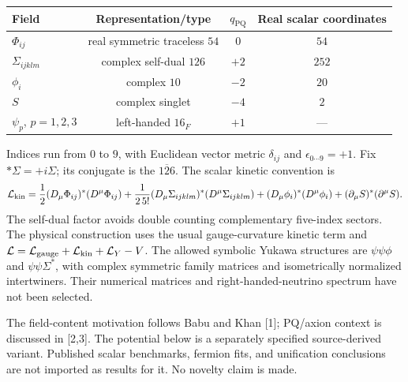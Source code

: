 \documentclass[10pt,letterpaper]{article}
\newcommand{\PQ}{\mathrm{PQ}}
\begin{document}
\begin{center}
\begin{tabular}{lccc}
\toprule Field & Representation/type & $q_{\PQ}$ & Real scalar coordinates\\
\midrule
$\Phi_{ij}$ & real symmetric traceless $54$ & $0$ & $54$\\
$\Sigma_{ijklm}$ & complex self-dual $126$ & $+2$ & $252$\\
$\phi_i$ & complex $10$ & $-2$ & $20$\\
$S$ & complex singlet & $-4$ & $2$\\
$\psi_p$, $p=1,2,3$ & left-handed $16_F$ & $+1$ & ---\\
\bottomrule
\end{tabular}
\end{center}
Indices run from $0$ to $9$, with Euclidean vector metric $\delta_{ij}$ and
$\epsilon_{0\cdots9}=+1$. Fix $*\Sigma=+i\Sigma$; its conjugate is the
$\overline{126}$. The scalar kinetic convention is
\[
\mathcal L_{\rm kin}=
\frac12(D_\mu\Phi_{ij})^*(D^\mu\Phi_{ij})
+\frac{1}{2\,5!}(D_\mu\Sigma_{ijklm})^*(D^\mu\Sigma_{ijklm})
+(D_\mu\phi_i)^*(D^\mu\phi_i)+(\partial_\mu S)^*(\partial^\mu S).
\]
The self-dual factor avoids double counting complementary five-index sectors.
The physical construction uses the usual gauge-curvature kinetic term and
$\mathcal L=\mathcal L_{\rm gauge}+\mathcal L_{\rm kin}+\mathcal L_Y-V$.
The allowed symbolic Yukawa structures are $\psi\psi\phi$ and
$\psi\psi\Sigma^*$, with complex symmetric family matrices and isometrically
normalized intertwiners. Their numerical matrices and right-handed-neutrino
spectrum have not been selected.

The field-content motivation follows Babu and Khan [1]; PQ/axion context is
discussed in [2,3]. The potential below is a separately specified source-derived
variant. Published scalar benchmarks, fermion fits, and unification conclusions
are not imported as results for it. No novelty claim is made.
\end{document}

